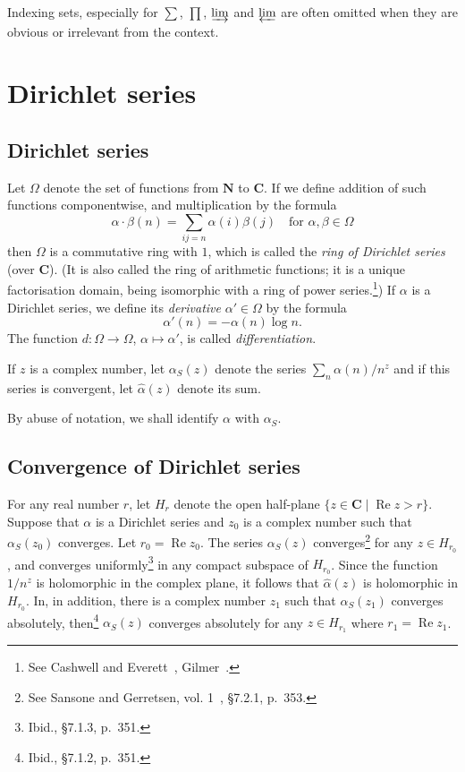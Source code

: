 \documentclass[10pt,leqno]{article}
\theoremstyle{definition}
\def\NN{\mathbf{N}}
\def\CC{\mathbf{C}}
\DeclareMathOperator{\re}{Re}
\def\fnon{See Cashwell and Everett~\cite{bib:31}, Gilmer~\cite{bib:63}.}
\def\fntw{See Sansone and Gerretsen, vol. 1~\cite{bib:162}, \S7.2.1, p.~353.}
\def\fnth{Ibid., \S7.1.3, p.~351.}
\def\fnfo{Ibid., \S7.1.2, p.~351.}
\begin{document}
Indexing sets, especially for $\sum$, $\prod$, $\varinjlim$ and $\varprojlim$ are often omitted when they are obvious or irrelevant from the context.



\section{Dirichlet series}
\label{ch:1}

\subsection{Dirichlet series}
\label{ch:1.1}

Let $\Omega$ denote the set of functions from $\NN$ to $\CC$.
If we define addition of such functions componentwise, and multiplication by the formula
\[
\alpha \cdot \beta(n)
= \sum_{ij=n} \alpha(i) \beta(j)
\quad
\text{for $\alpha,\beta \in \Omega$}
\]
then $\Omega$ is a commutative ring with $1$, which is called the \emph{ring of Dirichlet series} (over $\CC$).
(It is also called the ring of arithmetic functions; it is a unique factorisation domain, being isomorphic with a ring of power series.\footnote{\fnon})
If $\alpha$ is a Dirichlet series, we define its \emph{derivative} $\alpha' \in \Omega$ by the formula
\[
\alpha'(n) = -\alpha(n) \log n.
\]
The function $d : \Omega \to \Omega$, $\alpha \mapsto \alpha'$, is called \emph{differentiation}.

If $z$ is a complex number, let $\alpha_S(z)$ denote the series $\sum_n \alpha(n) / n^z$ and if this series is convergent, let $\widehat \alpha(z)$ denote its sum.

By abuse of notation, we shall identify $\alpha$ with $\alpha_S$.


\subsection{Convergence of Dirichlet series}
\label{ch:1.2}

For any real number $r$, let $H_r$ denote the open half-plane $\{ z \in \CC \mid \re z > r \}$.
Suppose that $\alpha$ is a Dirichlet series and $z_0$ is a complex number such that $\alpha_S(z_0)$ converges.
Let $r_0 = \re z_0$.
The series $\alpha_S(z)$ converges\footnote{\fntw} for any $z \in H_{r_0}$, and converges uniformly\footnote{\fnth} in any compact subspace of $H_{r_0}$.
Since the function $1/n^z$ is holomorphic in the complex plane, it follows that $\widehat\alpha(z)$ is holomorphic in $H_{r_0}$.
In, in addition, there is a complex number $z_1$ such that $\alpha_S(z_1)$ converges absolutely, then\footnote{\fnfo} $\alpha_S(z)$ converges absolutely for any $z \in H_{r_1}$ where $r_1 = \re z_1$.
\end{document}
